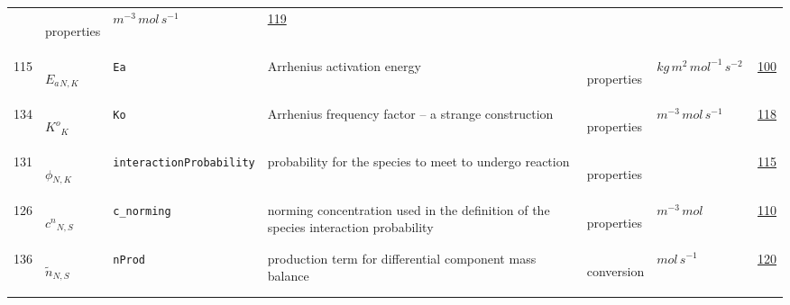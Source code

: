 \begin{longtable}{|p{1cm}|p{2.5cm}|p{4.5cm}|p{8cm}|p{3.0cm}|p{3cm}|p{1cm}|}
             & \begin{lay}properties \end{lay}
             & $ m^{-3} \,mol \,s^{-1} \, $
             &                 \hyperlink{"e:119"}{ 119 }
                 \\
            115
             & \hypertarget{"v:115"}{ $ {E_a}{_{N, K}} $}
             & \verb|Ea|
             & Arrhenius activation energy
             & \begin{lay}properties \end{lay}
             & $ kg \,m^{2} \,mol^{-1} \,s^{-2} \, $
             &                 \hyperlink{"e:100"}{ 100 }
                 \\
            134
             & \hypertarget{"v:134"}{ $ {{K^o}}{_{K}} $}
             & \verb|Ko|
             & Arrhenius frequency factor -- a strange construction
             & \begin{lay}properties \end{lay}
             & $ m^{-3} \,mol \,s^{-1} \, $
             &                 \hyperlink{"e:118"}{ 118 }
                 \\
            131
             & \hypertarget{"v:131"}{ $ {\phi}{_{N, K}} $}
             & \verb|interactionProbability|
             & probability for the species to meet to undergo reaction
             & \begin{lay}properties \end{lay}
             & $  $
             &                 \hyperlink{"e:115"}{ 115 }
                 \\
            126
             & \hypertarget{"v:126"}{ $ {c^n}{_{N, S}} $}
             & \verb|c_norming|
             & norming concentration used in the definition of the species interaction probability
             & \begin{lay}properties \end{lay}
             & $ m^{-3} \,mol \, $
             &                 \hyperlink{"e:110"}{ 110 }
                 \\
            136
             & \hypertarget{"v:136"}{ $ {{\tilde{n}}}{_{N, S}} $}
             & \verb|nProd|
             & production term for differential component mass balance
             & \begin{lay}conversion \end{lay}
             & $ mol \,s^{-1} \, $
             &                 \hyperlink{"e:120"}{ 120 }
                 \\
    \end{longtable}